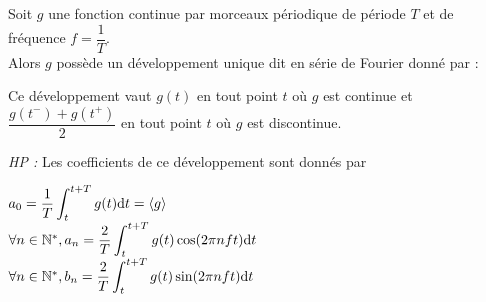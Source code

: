 \documentclass[a4paper]{article}
\begin{document}
\pagestyle{fancy}
\fancyhf{}
\setlength{\headheight}{15pt}

\begin{center}
	\large{}
\end{center}


Soit \(g\) une fonction continue par morceaux périodique de période \(T\) et de fréquence \(f=\dfrac{1}{T}\).\\
Alors \(g\) possède un développement unique dit en série de Fourier donné par :
\begin{center}\end{center}
Ce développement vaut \(g(t)\) en tout point \(t\) où \(g\) est continue et \(\dfrac{g(t^-)+g(t^+)}{2}\) en tout point \(t\) où \(g\) est discontinue.

\emph{HP :} Les coefficients de ce développement sont donnés par \begin{center}\(a_0=\dfrac{1}{T}\displaystyle\int_t^{t+T}g(t)\mathrm{d}t=\langle g \rangle\)\\
\(\forall n \in \mathbb{N}^*,a_n=\dfrac{2}{T}\displaystyle\int_t^{t+T}g(t)\cos(2\pi nft)\mathrm{d}t\)\\
\(\forall n \in \mathbb{N}^*,b_n=\dfrac{2}{T}\displaystyle\int_t^{t+T}g(t)\sin(2\pi nft)\mathrm{d}t\)\end{center}
\end{document}
